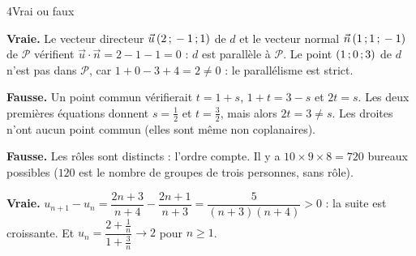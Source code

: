 \begin{corrigeBac}{4}{Vrai ou faux}
\begin{questions}
  \item \textbf{Vraie.} Le vecteur directeur $\vec u\,(2\,{;}\,-1\,{;}\,1)$ de $d$ et le vecteur normal $\vec n\,(1\,{;}\,1\,{;}\,-1)$ de $\mathcal{P}$
    vérifient $\vec u\cdot\vec n=2-1-1=0$ : $d$ est parallèle à $\mathcal{P}$. Le point $(1\,{;}\,0\,{;}\,3)$ de $d$ n'est pas dans $\mathcal{P}$,
    car $1+0-3+4=2\neq0$ : le parallélisme est strict. \pts{1 pt}
  \item \textbf{Fausse.} Un point commun vérifierait $t=1+s$, $1+t=3-s$ et $2t=s$. Les deux premières équations donnent $s=\frac12$ et
    $t=\frac32$, mais alors $2t=3\neq s$. Les droites n'ont aucun point commun (elles sont même non coplanaires). \pts{1 pt}
  \item \textbf{Fausse.} Les rôles sont distincts : l'ordre compte. Il y a $10\times9\times8=720$ bureaux possibles ($120$ est le nombre de
    groupes de trois personnes, sans rôle). \pts{1 pt}
  \item \textbf{Vraie.} $u_{n+1}-u_n=\dfrac{2n+3}{n+4}-\dfrac{2n+1}{n+3}=\dfrac{5}{(n+3)(n+4)}>0$ : la suite est croissante. Et
    $u_n=\dfrac{2+\frac1n}{1+\frac3n}\to2$ pour $n\geq1$. \pts{1 pt}
\end{questions}
\end{corrigeBac}


